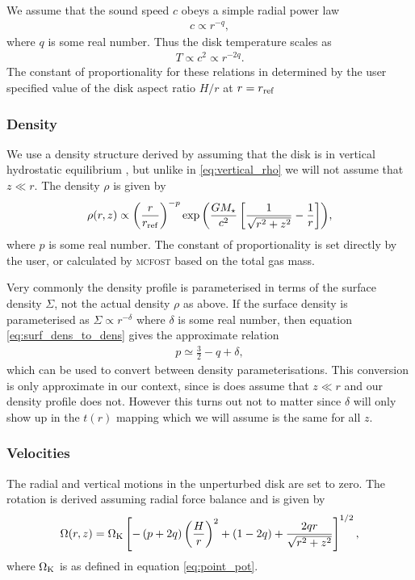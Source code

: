 We assume that the sound speed $c$ obeys a simple radial power law 
\begin{align}
    c \propto r^{-q},
\end{align}
where $q$ is some real number. Thus the disk temperature scales as 
\begin{align}
    T \propto c^2 \propto r^{-2q}.
\end{align}
The constant of proportionality for these relations in determined by the user specified value of the disk aspect ratio $H/r$ at $r=r_{\rm ref}$

\subsubsection{Density}

We use a density structure derived by assuming that the disk is in vertical hydrostatic equilibrium \citep{pringle1981}, but unlike in \ref{eq:vertical_rho} we will not assume that $z\ll r$.
The density $\rho$ is given by 
\begin{align}
    \rho(r,z) \propto \left( \frac{r}{r_{\rm ref}} \right)^{-p} \exp{\left( \frac{G M_\star}{c^2} \left[ \frac{1}{\sqrt{r^2 + z^2}} - \frac{1}{r} \right] \right)},
\end{align}
where $p$ is some real number. 
The constant of proportionality is set directly by the user, or calculated by \textsc{mcfost} based on the total gas mass.

Very commonly the density profile is parameterised in terms of the surface density $\Sigma$, not the actual density $\rho$ as above.
If the surface density is parameterised as $\Sigma \propto r^{-\delta}$ where $\delta$ is some real number, then equation \ref{eq:surf_dens_to_dens} gives the approximate relation 
\begin{align}
    p \simeq \frac{3}{2} - q + \delta,
\end{align}
which can be used to convert between density parameterisations.
This conversion is only approximate in our context, since is does assume that $z \ll r$ and our density profile does not.
However this turns out not to matter since $\delta$ will only show up in the $t(r)$ mapping which we will assume is the same for all $z$.

\subsubsection{Velocities}

The radial and vertical motions in the unperturbed disk are set to zero. 
The rotation is derived assuming radial force balance \citep[eg.][]{nelson2013} and is given by 
\begin{align}
    \Omega(r,z) = \Omega_{\rm K} \left[ - \left(p + 2q\right) \left( \frac{H}{r} \right)^2 + \left( 1-2q \right) + \frac{2qr}{\sqrt{r^2 + z^2}}\right]^{1/2},
\end{align}
where $\Omega_{\rm K}$ is as defined in equation \ref{eq:point_pot}.

